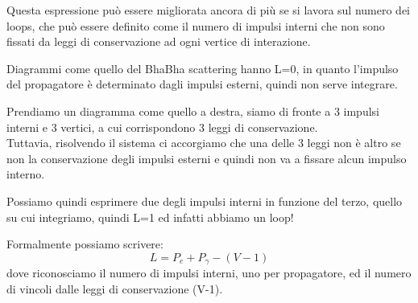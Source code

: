 \documentclass[../main.tex]{subfiles}
\begin{document}
Questa espressione può essere migliorata ancora di più se si lavora sul numero dei loops, che può essere definito come il numero di impulsi interni che non sono fissati da leggi di conservazione ad ogni vertice di interazione.

Diagrammi come quello del BhaBha scattering hanno L=0, in quanto l'impulso del propagatore è determinato dagli impulsi esterni, quindi non serve integrare.
\begin{example}
Prendiamo un diagramma come quello a destra, siamo di fronte a 3 impulsi interni e 3 vertici, a cui corrispondono 3 leggi di conservazione.\\
Tuttavia, risolvendo il sistema ci accorgiamo che una delle 3 leggi non è altro se non la conservazione degli impulsi esterni e quindi non va a fissare alcun impulso interno.

Possiamo quindi esprimere due degli impulsi interni in funzione del terzo, quello su cui integriamo, quindi L=1 ed infatti abbiamo un loop!
\end{example}

Formalmente possiamo scrivere:
\begin{equation}
    L = P_e+P_\gamma - (V-1)
    \label{eq:L_propagators_vertices}
\end{equation}
dove riconosciamo il numero di impulsi interni, uno per propagatore, ed il numero di vincoli dalle leggi di conservazione (V-1).
\end{document}
